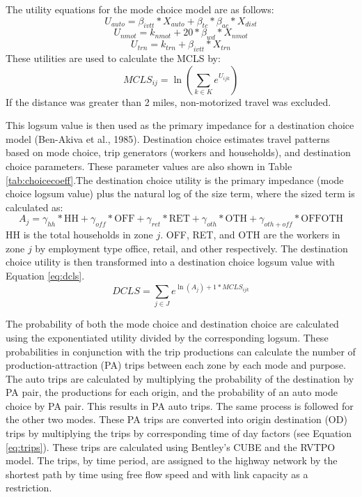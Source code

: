 \documentclass[fancy, masters, twoside]{byuthesis}
\begin{document}
The utility equations for the mode choice model are as follows:
\begin{equation}
U_{auto} = \beta_{ivtt} * X_{auto} + \beta_{tc} * \beta_{ac} * X_{dist}
\label{eq:driveutil}
\end{equation} \begin{equation}
U_{nmot} = k_{nmot} + 20 * \beta_{wd}*X_{nmot}
\label{eq:nonmoutil}
\end{equation} \begin{equation}
U_{trn} = k_{trn} + \beta_{ivtt} * X_{trn}
\label{eq:transutil}
\end{equation}
These utilities are used to calculate the MCLS by:
\begin{equation}
MCLS_{ij} = \ln(\sum_{k \in K} e^{U_{ijk}})
\label{eq:mcls}
\end{equation}
If the distance was greater than 2 miles, non-motorized travel was excluded.

This logsum value is then used as the primary impedance for a destination choice model (Ben-Akiva et al., 1985). Destination choice estimates travel patterns based on mode choice, trip generators (workers and households), and destination choice parameters. These parameter values are also shown in Table \ref{tab:choicecoeff}.The destination choice utility is the primary impedance (mode choice logsum value) plus the natural log of the size term, where the sized term is calculated as:
\begin{equation}
A_j = \gamma_{hh} * \mathrm{HH} + \gamma_{off} * \mathrm{OFF} + \gamma_{ret} * \mathrm{RET} + \gamma_{oth} * \mathrm{OTH} + \gamma_{oth+off} * \mathrm{OFFOTH}
\label{eq:dcsizeterm}
\end{equation}
HH is the total households in zone \(j\). OFF, RET, and OTH are the workers in zone \(j\) by employment type office, retail, and other respectively. The destination choice utility is then transformed into a destination choice logsum value with Equation \eqref{eq:dcls}.
\begin{equation}
DCLS = \sum_{j \in J} e^{\ln(A_j) + 1* MCLS_{ijk}}
\label{eq:dcls}
\end{equation}

The probability of both the mode choice and destination choice are calculated using the exponentiated utility divided by the corresponding logsum. These probabilities in conjunction with the trip productions can calculate the number of production-attraction (PA) trips between each zone by each mode and purpose. The auto trips are calculated by multiplying the probability of the destination by PA pair, the productions for each origin, and the probability of an auto mode choice by PA pair. This results in PA auto trips. The same process is followed for the other two modes. These PA trips are converted into origin destination (OD) trips by multiplying the trips by corresponding time of day factors (see Equation \eqref{eq:trips}). These trips are calculated using Bentley's CUBE and the RVTPO model. The trips, by time period, are assigned to the highway network by the shortest path by time using free flow speed and with link capacity as a restriction.
\end{document}
